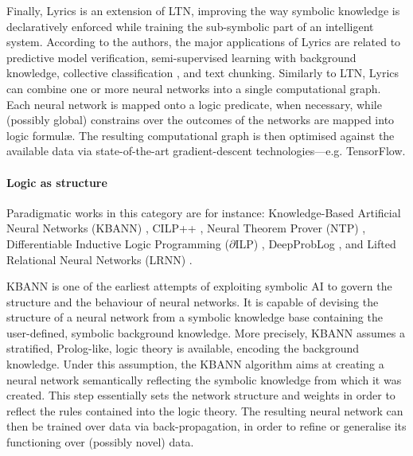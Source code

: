 \documentclass[12pt,a4paper,openright,twoside]{book}
\begin{document}
Finally, Lyrics \cite{marra2019lyrics} is an extension of LTN, improving the way symbolic knowledge is declaratively enforced while training the sub-symbolic part of an intelligent system.
%
According to the authors, the major applications of Lyrics are related to predictive model verification, semi-supervised learning with background knowledge, collective classification \cite{SenNBGGE08}, and text chunking.
%
Similarly to LTN, Lyrics can combine one or more neural networks into a single computational graph.
%
Each neural network is mapped onto a logic predicate, when necessary, while (possibly global) constrains over the outcomes of the networks are mapped into logic formul\ae{}.
%
The resulting computational graph is then optimised against the available data via state-of-the-art gradient-descent technologies---e.g. TensorFlow.

\paragraph{Logic as structure}

Paradigmatic works in this category are for instance: Knowledge-Based Artificial Neural Networks (KBANN) \cite{Towell1990}, CILP++ \cite{Franca2014}, Neural Theorem Prover (NTP) \cite{rocktaschel2017}, Differentiable Inductive Logic Programming ($\partial$ILP) \cite{Evans2017}, DeepProbLog \cite{Manhaeve2018}, and Lifted Relational Neural Networks (LRNN) \cite{SourekAZSK18}.

KBANN \cite{Towell1990} is one of the earliest attempts of exploiting symbolic AI to govern the structure and the behaviour of neural networks.
%
It is capable of devising the structure of a neural network from a symbolic knowledge base containing the user-defined, symbolic background knowledge.
%
More precisely, KBANN assumes a stratified, Prolog-like, logic theory is available, encoding the background knowledge.
%
Under this assumption, the KBANN algorithm aims at creating a neural network semantically reflecting the symbolic knowledge from which it was created.
%
This step essentially sets the network structure and weights in order to reflect the rules contained into the logic theory.
%
The resulting neural network can then be trained over data via back-propagation, in order to refine or generalise its functioning over (possibly novel) data.
%
%
\end{document}
